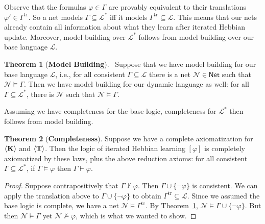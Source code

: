 \documentclass[letterpaper]{article}
\theoremstyle{definition}
\newtheorem{theorem}{Theorem}
\newenvironment{sketch}{\begin{proof}[Proof Sketch]}{\end{proof}}
\newcommand{\lang}{\mathcal{L}}
\newcommand{\uplang}{\mathcal{L}^\ast}
\newcommand{\set}[1]{\{ #1 \}}
\newcommand{\proves}{\vdash}
\newcommand{\AllNets}{\mathsf{Net}}
\newcommand{\Net}{\mathcal{N}}
\newcommand{\Hebbop}[1]{[#1]}
\newcommand{\diaTyp}[1]{\langle \textrm{\textup{\textbf{T}}} \rangle #1}
\newcommand{\diaKnowNoArgs}{\langle \textrm{\textup{\textbf{K}}} \rangle}
\begin{document}
Observe that the formulas $\varphi \in \Gamma$ are provably equivalent to their translations $\varphi' \in \Gamma^\mathrm{tr}$.  So a net models $\Gamma \subseteq \uplang$ iff it models $\Gamma^\mathrm{tr} \subseteq \lang$.  This means that our nets already contain all information about what they learn after iterated Hebbian update.  Moreover, model building over $\uplang$ follows from model building over our base language $\lang$.

\begin{theorem}[\textbf{Model Building}]~\label{model_building}
Suppose that we have model building for our base language $\lang$, i.e., for all consistent $\Gamma \subseteq \lang$ there is a net $\Net \in \AllNets$ such that $\Net \models \Gamma$.  Then we have model building for our dynamic language as well: for all $\Gamma \subseteq \uplang$, there is $\Net$ such that $\Net \models \Gamma$.
\end{theorem}

Assuming we have completeness for the base logic, completeness for $\uplang$ then follows from model building.

\begin{theorem}[\textbf{Completeness}]\label{completeness}
    Suppose we have a complete axiomatization for $\diaKnowNoArgs$ and $\diaTyp$.  Then the logic of iterated Hebbian learning $\Hebbop{\varphi}$ is completely axiomatized by these laws, plus the above reduction axioms: for all consistent $\Gamma \subseteq \uplang$, if $\Gamma \models \varphi$ then $\Gamma \proves \varphi$.
\end{theorem}
\begin{proof}
    Suppose contrapositively that $\Gamma \not \proves \varphi$.  Then $\Gamma \cup \set{\neg \varphi}$ is consistent.  We can apply the translation above to $\Gamma \cup \set{\neg \varphi}$ to obtain $\Gamma^\mathrm{tr} \subseteq \lang$.  Since we assumed the base logic is complete, we have a net $\Net \models \Gamma^\mathrm{tr}$.  By Theorem~\ref{model_building}, $\Net \models \Gamma \cup \set{\neg \varphi}$.  But then $\Net \models \Gamma$ yet $\Net \not \models \varphi$, which is what we wanted to show.
\end{proof}
\end{document}
